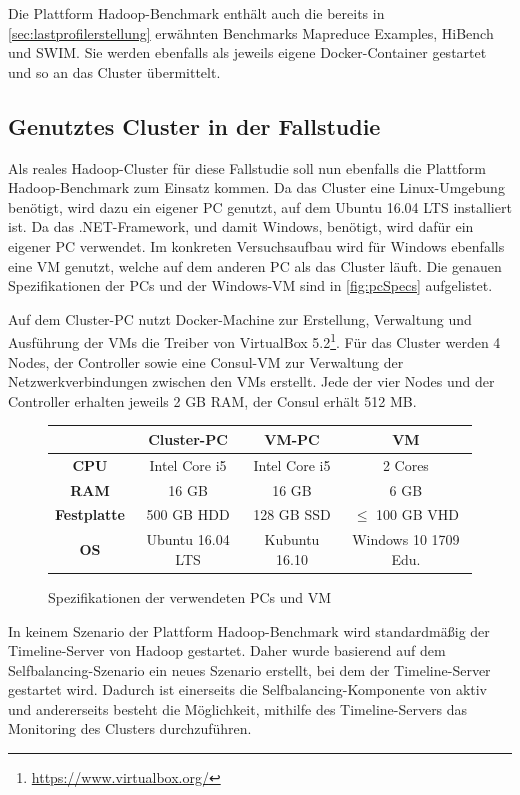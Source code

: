 Die Plattform Hadoop-Benchmark enthält auch die bereits in \autoref{sec:lastprofilerstellung} erwähnten Benchmarks Mapreduce Examples, HiBench und SWIM. Sie werden ebenfalls als jeweils eigene Docker-Container gestartet und so an das Cluster übermittelt.

\subsection{Genutztes Cluster in der Fallstudie}\label{sec:clusterFallstudie}

Als reales Hadoop-Cluster für diese Fallstudie soll nun ebenfalls die Plattform Hadoop-Benchmark zum Einsatz kommen. Da das Cluster eine Linux-Umgebung benötigt, wird dazu ein eigener PC genutzt, auf dem Ubuntu 16.04 LTS installiert ist. Da \sS das .NET-Framework, und damit Windows, benötigt, wird dafür ein eigener PC verwendet. Im konkreten Versuchsaufbau wird für Windows ebenfalls eine VM genutzt, welche auf dem anderen PC als das Cluster läuft. Die genauen Spezifikationen der PCs und der Windows-VM sind in \autoref{fig:pcSpecs} aufgelistet.

Auf dem Cluster-PC nutzt Docker-Machine zur Erstellung, Verwaltung und Ausführung der VMs die Treiber von VirtualBox 5.2\footnote{\url{https://www.virtualbox.org/}}. Für das Cluster werden 4 Nodes, der Controller sowie eine Consul-VM zur Verwaltung der Netzwerkverbindungen zwischen den VMs erstellt. Jede der vier Nodes und der Controller erhalten jeweils 2 GB RAM, der Consul erhält 512 MB.

\begin{figure}
    \centering
    \begin{tabular}{|c|c|c|c|}
    	\hline
    	     \textbf{}      & \textbf{Cluster-PC} & \textbf{VM-PC} &     \textbf{VM}      \\ \hline\hline
    	   \textbf{CPU}     &    Intel Core i5    & Intel Core i5  &       2 Cores        \\ \hline
    	   \textbf{RAM}     &        16 GB        &     16 GB      &         6 GB         \\ \hline
    	\textbf{Festplatte} &     500 GB HDD      &   128 GB SSD   &  $\leq$ 100 GB VHD   \\ \hline
    	    \textbf{OS}     &  Ubuntu 16.04 LTS   & Kubuntu 16.10  & Windows 10 1709 Edu. \\ \hline
    \end{tabular}
    \caption{Spezifikationen der verwendeten PCs und VM}
    \label{fig:pcSpecs}
\end{figure}

In keinem Szenario der Plattform Hadoop-Benchmark wird standardmäßig der Timeline-Server von Hadoop gestartet. Daher wurde basierend auf dem Selfbalancing-Szenario ein neues Szenario erstellt, bei dem der Timeline-Server gestartet wird. Dadurch ist einerseits die Selfbalancing-Komponente von \citeauthor{zhang2016} aktiv und andererseits besteht die Möglichkeit, mithilfe des Timeline-Servers das Monitoring des Clusters durchzuführen.

